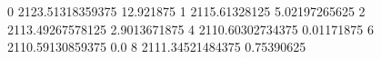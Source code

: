 0 2123.51318359375 12.921875
1 2115.61328125 5.02197265625
2 2113.49267578125 2.9013671875
4 2110.60302734375 0.01171875
6 2110.59130859375 0.0
8 2111.34521484375 0.75390625
